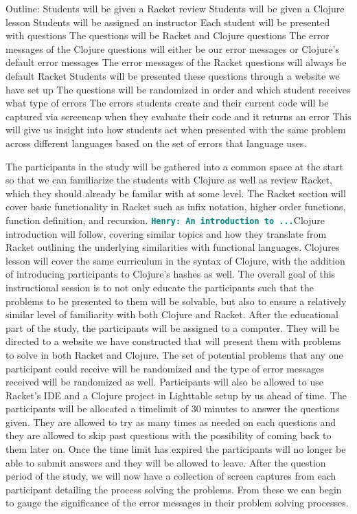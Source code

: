\documentclass[12pt]{article}
\newcommand{\comment}[1]{{\bf \tt  {#1}}}
\newcommand{\hfcomment}[1]{\textcolor{Teal}{\comment{Henry: {#1}}}}
\begin{document}
Outline:
Students will be given a Racket review
Students will be given a Clojure lesson
Students will be assigned an instructor
Each student will be presented with questions
The questions will be Racket and Clojure questions
The error messages of the Clojure questions will either be our error messages or Clojure's default error messages
The error messages of the Racket questions will always be default Racket
Students will be presented these questions through a website we have set up
The questions will be randomized in order and which student receives what type of errors
The errors students create and their current code will be captured via screencap when they evaluate their code and it returns an error
This will give us insight into how students act when presented with the same problem across different languages based on the set of errors that language uses.


	The participants in the study will be gathered into a common space at the start so that we can familiarize the students with Clojure as well as review Racket, which they should already be familar with at some level. The Racket section will cover basic functionality in Racket such as infix notation, higher order functions, function definition, and recursion. \hfcomment{An introduction to ...}Clojure introduction will follow, covering similar topics and how they translate from Racket outlining the underlying similarities with functional languages. Clojures lesson will cover the same curriculum in the syntax of Clojure, with the addition of introducing participants to Clojure's hashes as well. The overall goal of this instructional session is to not only educate the participants such that the problems to be presented to them will be solvable, but also to ensure a relatively similar level of familiarity with both Clojure and Racket. 
	After the educational part of the study, the participants will be assigned to a computer. They will be directed to a website we have constructed that will present them with problems to solve in both Racket and Clojure. The set of potential problems that any one participant could receive will be randomized and the type of error messages received will be randomized as well. Participants will also be allowed to use Racket's IDE and a Clojure project in Lighttable setup by us ahead of time. The participants will be allocated a timelimit of 30 minutes to answer the questions given. They are allowed to try as many times as needed on each questions and they are allowed to skip past questions with the possibility of coming back to them later on. Once the time limit has expired the participants will no longer be able to submit answers and they will be allowed to leave. After the question period of the study, we will now have a collection of screen captures from each participant detailing the process solving the problems. From these we can begin to gauge the significance of the error messages in their problem solving processes.
	
\end{document}
